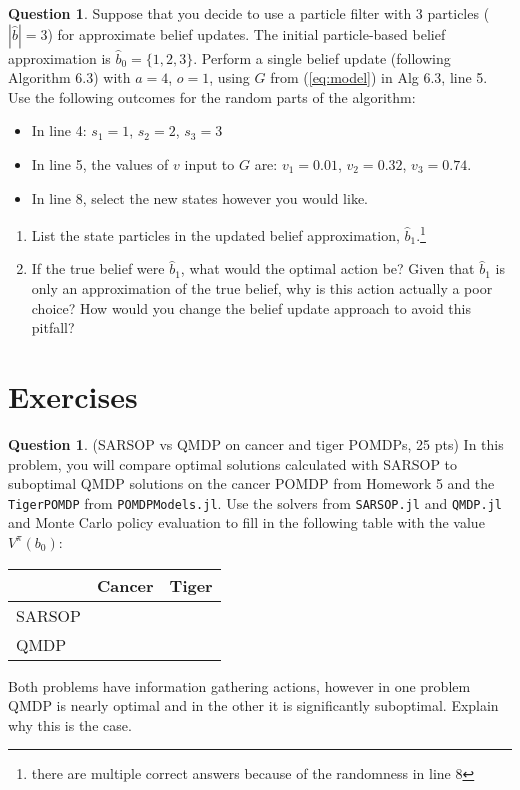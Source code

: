\documentclass{article}
\theoremstyle{definition}
\newtheorem{question}[thm]{Question}
\begin{document}
\begin{question}
Suppose that you decide to use a particle filter with 3 particles ($|\hat{b}|=3$) for approximate belief updates. The initial particle-based belief approximation is $\hat{b}_0 = \{1, 2, 3\}$. Perform a single belief update (following Algorithm 6.3) with $a=4$, $o=1$, using $G$ from (\ref{eq:model}) in Alg 6.3, line 5. Use the following outcomes for the random parts of the algorithm:
\begin{itemize}[noitemsep]
    \item In line 4: $s_1 = 1$, $s_2 = 2$, $s_3 = 3$
    \item In line 5, the values of $v$ input to $G$ are: $v_1 = 0.01$, $v_2 = 0.32$, $v_3=0.74$.
    \item In line 8, select the new states however you would like.
\end{itemize}

\begin{enumerate}[label=(\alph*)]
    \item List the state particles in the updated belief approximation, $\hat{b}_1$.\footnote{there are multiple correct answers because of the randomness in line 8}
    \item If the true belief were $\hat{b}_1$, what would the optimal action be? Given that $\hat{b}_1$ is only an approximation of the true belief, why is this action actually a poor choice? How would you change the belief update approach to avoid this pitfall?
\end{enumerate}

\end{question}

\section{Exercises}

\begin{question}
    (SARSOP vs QMDP on cancer and tiger POMDPs, 25 pts) In this problem, you will compare optimal solutions calculated with SARSOP to suboptimal QMDP solutions on the cancer POMDP from Homework 5 and the \texttt{TigerPOMDP} from \texttt{POMDPModels.jl}. Use the solvers from \texttt{SARSOP.jl} and \texttt{QMDP.jl} and Monte Carlo policy evaluation to fill in the following table with the value $V^\pi(b_0)$:\\
    \begin{tabular}{l|c|c}
               & Cancer & Tiger \\
        \midrule
        SARSOP &        &       \\
        \midrule
        QMDP   &        &
    \end{tabular}

Both problems have information gathering actions, however in one problem QMDP is nearly optimal and in the other it is significantly suboptimal. Explain why this is the case.
\end{question}
\end{document}
